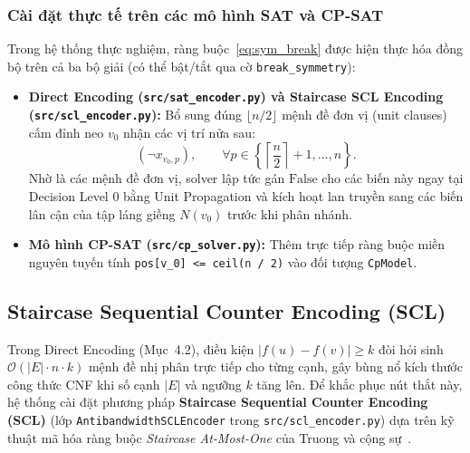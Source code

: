 \documentclass[a4paper,fleqn]{cas-sc}
\begin{document}
\subsubsection{Cài đặt thực tế trên các mô hình SAT và CP-SAT}
Trong hệ thống thực nghiệm, ràng buộc~\eqref{eq:sym_break} được hiện thực hóa đồng bộ trên cả ba bộ giải (có thể bật/tắt qua cờ \texttt{break\_symmetry}):
\begin{itemize}
    \item \textbf{Direct Encoding (\texttt{src/sat\_encoder.py}) và Staircase SCL Encoding (\texttt{src/scl\_encoder.py}):} Bổ sung đúng $\lfloor n/2 \rfloor$ mệnh đề đơn vị (unit clauses) cấm đỉnh neo $v_0$ nhận các vị trí nửa sau:
    \begin{equation}
        (\neg x_{v_0, p}), \qquad \forall p \in \left\{\left\lceil \frac{n}{2} \right\rceil + 1, \dots, n\right\}.
    \end{equation}
    Nhờ là các mệnh đề đơn vị, solver lập tức gán $\text{False}$ cho các biến này ngay tại Decision Level 0 bằng Unit Propagation và kích hoạt lan truyền sang các biến lân cận của tập láng giềng $N(v_0)$ trước khi phân nhánh.
    \item \textbf{Mô hình CP-SAT (\texttt{src/cp\_solver.py}):} Thêm trực tiếp ràng buộc miền nguyên tuyến tính \texttt{pos[v\_0] <= ceil(n / 2)} vào đối tượng \texttt{CpModel}.
\end{itemize}

\subsection{Staircase Sequential Counter Encoding (SCL)}
\label{sec:scl}
Trong Direct Encoding (Mục~4.2), điều kiện $|f(u) - f(v)| \ge k$ đòi hỏi sinh $\mathcal{O}(|E| \cdot n \cdot k)$ mệnh đề nhị phân trực tiếp cho từng cạnh, gây bùng nổ kích thước công thức CNF khi số cạnh $|E|$ và ngưỡng $k$ tăng lên. Để khắc phục nút thắt này, hệ thống cài đặt phương pháp \textbf{Staircase Sequential Counter Encoding (SCL)} (lớp \texttt{AntibandwidthSCLEncoder} trong \texttt{src/scl\_encoder.py}) dựa trên kỹ thuật mã hóa ràng buộc \textit{Staircase At-Most-One} của Truong và cộng sự~\cite{truong2025}.
\end{document}
